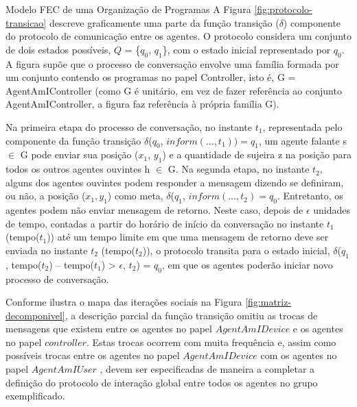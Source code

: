 \begin{section}{Modelo FEC de uma Organização de Programas}
        A Figura \ref{fig:protocolo-transicao} descreve graficamente uma parte da função transição ($\delta$) componente do protocolo de comunicação entre os agentes. O protocolo considera um conjunto de dois estados possíveis, $Q$ = \{$q_0$, $q_1$\}, com o estado inicial representado por $q_0$. A figura supõe que o processo de conversação envolve uma família formada por um conjunto contendo os programas no papel Controller, isto é, G = {AgentAmIController} (como G é unitário, em vez de fazer referência ao conjunto AgentAmIController, a figura faz referência à própria família G).
            
        \begin{figure}[h!]
            \centering
        \end{figure}
       
        Na primeira etapa do processo de conversação, no instante $t_1$, representada pelo componente da função transição $\delta$($q_0$, $inform(\ldots, t_1)) = q_1$, um agente falante s $\in$ G pode enviar sua posição ($x_1$, $y_1$) e a quantidade de sujeira z na posição para todos os outros agentes ouvintes h $\in$ G. Na segunda etapa, no instante $t_2$, alguns dos agentes ouvintes podem responder a mensagem dizendo se definiram, ou não, a posição ($x_1,y_1$) como meta, $\delta$($q_1$, $inform(\ldots, t_2) = q_0$. Entretanto, os agentes podem não enviar mensagem de retorno. Neste caso, depois de $\epsilon$ unidades de tempo, contadas a partir do horário de início da conversação no instante $t_1$ (tempo($t_1$)) até um tempo limite em que uma mensagem de retorno deve ser enviada no instante $t_2$ (tempo($t_2$)), o protocolo transita para o estado inicial, $\delta$($q_1$, tempo($t_2$) – tempo($t_1$) > $\epsilon$, $t_2$) = $q_0$, em que os agentes poderão iniciar novo processo de conversação.
        
        Conforme ilustra o mapa das iterações sociais na Figura \ref{fig:matriz-decomponivel}, a descrição parcial da função transição omitiu as trocas de mensagens que existem entre os agentes no papel $AgentAmIDevice$ e os agentes no papel $controller$. Estas trocas ocorrem com muita frequência e, assim como possíveis trocas entre os agentes no papel $AgentAmIDevice$ com os agentes no papel $AgentAmIUser$   , devem ser especificadas de maneira a completar a definição do protocolo de interação global entre todos os agentes no grupo exemplificado.
        
\end{section}

